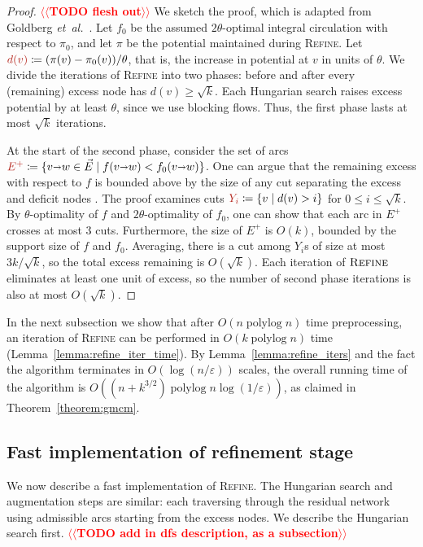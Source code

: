 \documentclass[11pt]{article}
\makeatletter
\def\etal{\emph{et~al.}}
\def\etal{\textit{et~al.}}
\def\polylog{\mathop{\mathrm{polylog}}}
\def\eps{\varepsilon}
\def\arcto{\mathord\shortrightarrow}
\def\arc#1#2{#1\arcto#2}
\theoremstyle{plain}
\numberwithin{figure}{section}
\def\EMPH#1{\textcolor{BrickRed}{{\emph{#1}}}}
\def\n@te#1{\textsf{\boldmath \textbf{$\langle\!\langle$#1$\rangle\!\rangle$}}\leavevmode}
\def\note#1{\textcolor{red}{\n@te{#1}}}
\makeatother
\begin{document}
\begin{proof}
\note{TODO flesh out} %
We sketch the proof, which is adapted from Goldberg \etal~\cite{GHKT17}.
Let $f_0$ be the assumed $2\theta$-optimal integral circulation with respect to $\pi_0$,
and let $\pi$ be the potential maintained during \textsc{Refine}.
Let $\EMPH{$d(v)$} \coloneqq (\pi(v) - \pi_0(v))/\theta$, that is, the increase in potential
at $v$ in units of $\theta$.
We divide the iterations of \textsc{Refine} into two phases: before and after
every (remaining) excess node has $d(v) \geq \sqrt{k}$.
Each Hungarian search raises excess potential by at least $\theta$,
since we use blocking flows.
Thus, the first phase lasts at most $\sqrt{k}$ iterations.

At the start of the second phase, consider the set of arcs
$\EMPH{$E^+$} \coloneqq \{\arc vw \in \vec{E} \mid f(\arc vw) < f_0(\arc vw)\}$.
One can argue that the remaining excess with respect to $f$ is bounded above by
the size of any cut separating the excess and deficit nodes \cite[Lemma~4]{GHKT17}.
The proof examines cuts $\EMPH{$Y_i$} \coloneqq \{v \mid d(v) > i\}$ for $0 \leq i \leq \sqrt{k}$.
By $\theta$-optimality of $f$ and $2\theta$-optimality of $f_0$, one can show
that each arc in $E^+$ crosses at most 3 cuts.
Furthermore, the size of $E^+$ is $O(k)$, bounded by the support size of $f$ and $f_0$.
Averaging, there is a cut among $Y_i$s of size at most $3k/\sqrt{k}$,
so the total excess remaining is $O(\sqrt{k})$.
Each iteration of $\textsc{Refine}$ eliminates at least one unit of excess,
so the number of second phase iterations is also at most $O(\sqrt{k})$.
\end{proof}

In the next subsection we show that after $O(n\polylog n)$ time preprocessing,
an iteration of \textsc{Refine} can be performed in $O(k\polylog n)$ time
(Lemma~\ref{lemma:refine_iter_time}).
By Lemma~\ref{lemma:refine_iters} and the fact the algorithm terminates in
$O(\log(n/\eps))$ scales, the overall running time of the algorithm is
$O((n + k^{3/2})\polylog n \log(1/\eps))$, as claimed in Theorem~\ref{theorem:gmcm}.

\subsection{Fast implementation of refinement stage}
\label{SS:fast_refine}

We now describe a fast implementation of \textsc{Refine}.
The Hungarian search and augmentation steps are similar:
each traversing through the residual network using admissible arcs starting
from the excess nodes.
We describe the Hungarian search first.
\note{TODO add in dfs description, as a subsection} %
\end{document}
